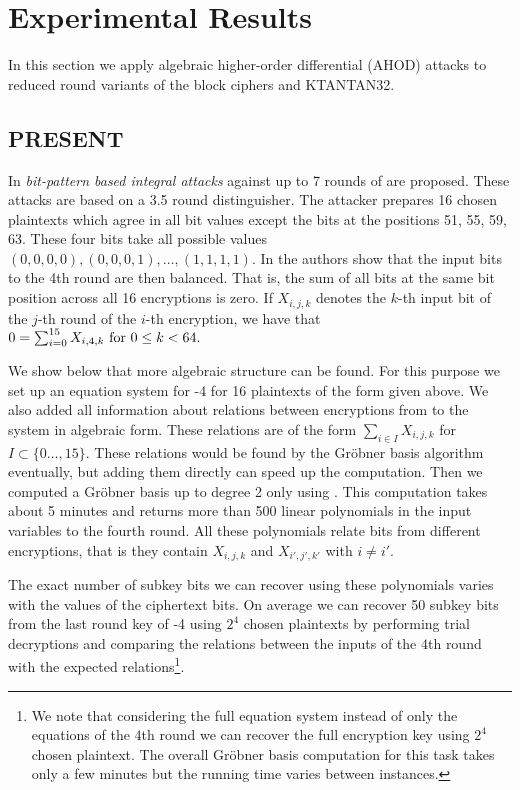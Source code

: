 \section{Experimental Results}
\label{sec:ahod-experiments}

In this section we apply algebraic higher-order differential (AHOD) attacks to reduced round variants of the block ciphers \PRESENT and KTANTAN32.

\subsection{PRESENT}

In \cite{bit-pattern-ia} \emph{bit-pattern based integral attacks} against up to 7 rounds of \PRESENT are proposed. These attacks are based on a 3.5 round distinguisher. The attacker prepares 16 chosen plaintexts which agree in all bit values except the bits at the positions 51, 55, 59, 63. These four bits take all possible values $(0,0,0,0),(0,0,0,1),\dots,(1,1,1,1)$. In \cite{bit-pattern-ia} the authors show that the input bits to the 4th round are then balanced. That is, the sum of all bits at the same bit position across all 16 encryptions is zero. If $X_{i,j,k}$ denotes the $k$-th input bit of the $j$-th round of the $i$-th encryption, we have that $0 = \sum_{i=0}^{15} X_{i,4,k} \textnormal{ for } 0 \leq k < 64.$ 

We show below that more algebraic structure can be found. For this purpose we set up an equation system for -4 for 16 plaintexts of the form given above. We also added all information about relations between encryptions from \cite{bit-pattern-ia} to the system in algebraic form. These relations are of the form $\sum_{i \in I} X_{i,j,k}$ for $I \subset \{0\dots,15\}$. These relations would be found by the Gröbner basis algorithm eventually, but adding them directly can speed up the computation. Then we computed a Gröbner basis up to degree 2 only using \PolyBoRi. This computation takes about 5 minutes and returns more than 500 linear polynomials in the input variables to the fourth round. All these polynomials relate bits from different encryptions, that is they contain $X_{i,j,k}$ and $X_{i',j',k'}$ with $i \neq i'$. 

The exact number of subkey bits we can recover using these polynomials varies with the values of the ciphertext bits. On average we can recover 50 subkey bits from the last round key of -4 using $2^4$ chosen plaintexts by performing trial decryptions and comparing the relations between the inputs of the $4$th round with the expected relations\footnote{We note that considering the full equation system instead of only the equations of the $4$th round we can recover the full encryption key using $2^4$ chosen plaintext. The overall Gröbner basis computation for this task takes only a few minutes but the running time varies between instances.}.


